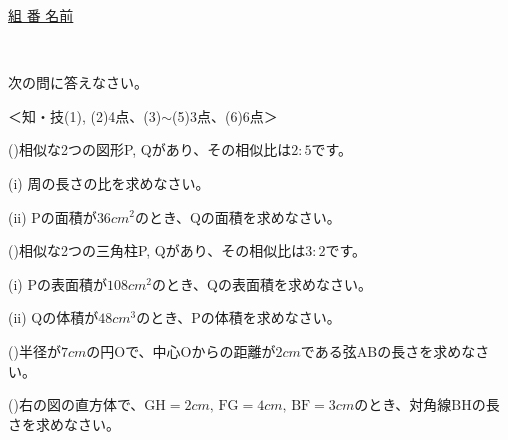 \documentclass[
  12pt,a4paper,lualatex,ja=standard]{bxjsarticle}
\begin{document}
\vspace{14mm}

\begin{center}
{\large \underline{\hspace{30mm}組 \hspace{30mm}番 \hspace{15mm} 名前 \hspace{60mm}}}
\end{center}

\newpage

　 \href{空白ページのための全角スペースあり。}{} \newpage

\pagestyle{plain}

\begin{flushleft}

\noindent{} \hspace{1pt}次の問に答えなさい。

%
\begin{flushright}%
\footnotesize{＜知・技(1), (2)4点、(3)$\sim$(5)3点、(6)6点＞}%
\end{flushright}%


()\hspace{2.5pt}相似な2つの図形P, Qがあり、その相似比は$2:5$です。

\hspace{1em} (i) 周の長さの比を求めなさい。

\hspace{1em} (ii) Pの面積が$36\si{cm}^2$のとき、Qの面積を求めなさい。

\vfill

()\hspace{2.5pt}相似な2つの三角柱P, Qがあり、その相似比は$3:2$です。

\hspace{1em} (i) Pの表面積が$108\si{cm}^2$のとき、Qの表面積を求めなさい。

\hspace{1em} (ii) Qの体積が$48\si{cm}^3$のとき、Pの体積を求めなさい。

\vfill

()\hspace{2.5pt}半径が$7\si{cm}$の円Oで、中心Oからの距離が$2\si{cm}$である弦ABの長さを求めなさい。

\vfill

\begin{multicols}{2}
()\hspace{2.5pt}右の図の直方体で、$\mbox{GH} = 2 \si{cm}, \, \mbox{FG} = 4\si{cm}, \, \mbox{BF} = 3 \si{cm}$のとき、対角線$\mbox{BH}$の長さを求めなさい。


\end{multicols}
\end{flushleft}
\end{document}
